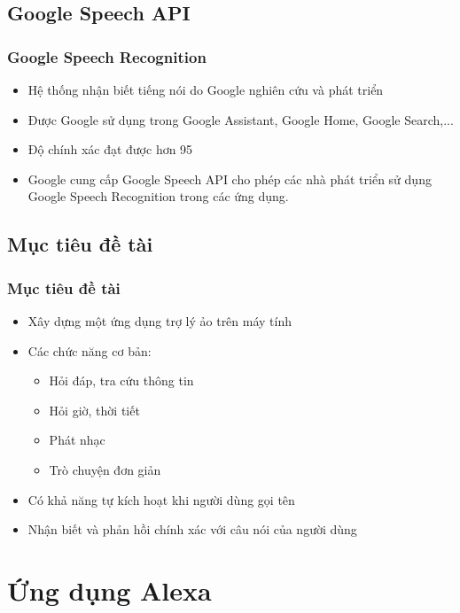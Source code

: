 \documentclass{beamer}
\begin{document}
\subsection{Google Speech API}
\begin{frame}
\frametitle{Google Speech Recognition}
\begin{itemize}
\item Hệ thống nhận biết tiếng nói do Google nghiên cứu và phát triển
\item Được Google sử dụng trong Google Assistant, Google Home, Google Search,...
\item Độ chính xác đạt được hơn 95%
\item Google cung cấp Google Speech API cho phép các nhà phát triển sử dụng Google Speech Recognition trong các ứng dụng.
\end{itemize}
\end{frame}

\subsection{Mục tiêu đề tài}

\begin{frame}
\frametitle{Mục tiêu đề tài}
\begin{itemize}
\item Xây dựng một ứng dụng trợ lý ảo trên máy tính
\item Các chức năng cơ bản:
    \begin{itemize}
    \item Hỏi đáp, tra cứu thông tin
    \item Hỏi giờ, thời tiết
    \item Phát nhạc
    \item Trò chuyện đơn giản
    \end{itemize}
\item Có khả năng tự kích hoạt khi người dùng gọi tên
\item Nhận biết và phản hồi chính xác với câu nói của người dùng
\end{itemize}
\end{frame}

\section{Ứng dụng Alexa}
\end{document}

